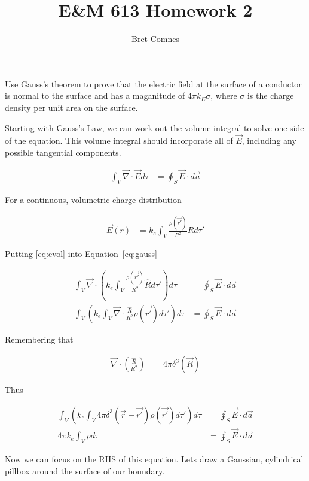 \documentclass{jhwhw}
\author{Bret Comnes}
\title{E\&M 613 Homework 2}
\begin{document}
Use Gauss's theorem to prove that the electric field at the surface of a conductor is normal to the surface and has a maganitude of $4 \pi k_E \sigma$, where $\sigma$ is the charge density per unit area on the surface.

\solution
Starting with Gauss's Law, we can work out the volume integral to solve one side of the equation.  This volume integral should incorporate all of $\vec{E}$, including any possible tangential components.

\begin{align}
    \label{eq:gauss}\int_V  \vec{\nabla} \cdot \vec{E} d\tau &= \oint_S \vec{E} \cdot d\vec{a}
\end{align}

For a continuous, volumetric charge distribution

\begin{align}
    \label{eq:evol}\vec{E}(r) &= k_e \int_V \frac{\rho(\vec{r'})}{R^2}\hat{R}d\tau'
\end{align}

Putting \eqref{eq:evol} into Equation~\eqref{eq:gauss}

\begin{align}
    \int_V  \vec{\nabla} \cdot \left(k_e \int_V \frac{\rho(\vec{r'})}{R^2}\hat{R}d\tau'\right) d\tau &= \oint_S \vec{E} \cdot d\vec{a} \\
    \int_V  \left(k_e \int_V \vec{\nabla} \cdot \frac{\hat{R}}{R^2}\rho(\vec{r'})d\tau'\right) d\tau &= \oint_S \vec{E} \cdot d\vec{a}
\end{align}

Remembering that

\begin{align}
    \vec{\nabla} \cdot \left( \frac{\hat{R}}{R^2} \right) &= 4 \pi \delta^3(\vec{R})
\end{align}

Thus

\begin{align}
    \int_V  
    \left(k_e 
    \int_V 4 \pi \delta^3(\vec{r}-\vec{r'}) \rho(\vec{r'})d\tau'
    \right) d\tau
    &= \oint_S \vec{E} \cdot d\vec{a} \\
    \label{eq:volint}
    4\pi k_e 
    \int_V  
    \rho d\tau
    &=
    \oint_S \vec{E} \cdot d\vec{a}
\end{align}

\pagebreak[3]

Now we can focus on the RHS of this equation.  Lets draw a Gaussian, cylindrical pillbox around the surface of our boundary.
\end{document}
